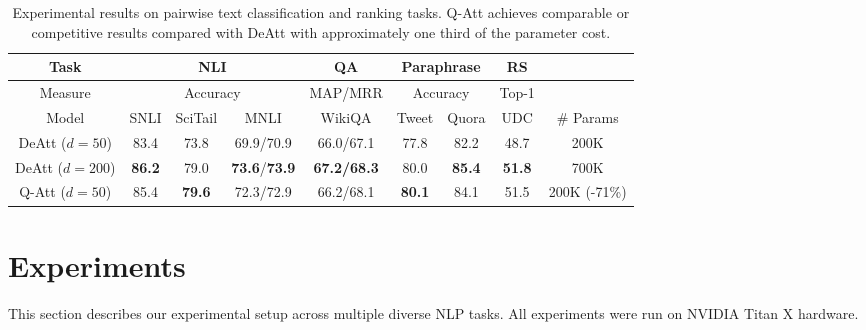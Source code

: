 \documentclass[11pt,a4paper]{article}
\begin{document}
\begin{table}
  \centering
  \small
    \begin{tabular}{c|ccc|c|cc|c|c}
    \hline
     Task & \multicolumn{3}{c|}{NLI} & QA & \multicolumn{2}{c|}{Paraphrase} & \multicolumn{1}{c|}{RS} & \\
    \hline
     Measure & \multicolumn{3}{c|}{Accuracy} & MAP/MRR & \multicolumn{2}{c|}{Accuracy} & \multicolumn{1}{c|}{Top-1} & \\
    \hline
          Model & \multicolumn{1}{c}{SNLI} & \multicolumn{1}{c}{SciTail} & MNLI  & WikiQA  & \multicolumn{1}{c}{Tweet} & \multicolumn{1}{c|}{Quora} & \multicolumn{1}{c|}{UDC} & \# Params \\
          \hline

    DeAtt ($d=50$) &  83.4     & 73.8      &  69.9/70.9 &  66.0/67.1 &    77.8   & 82.2  &  48.7     & 200K \\
    DeAtt ($d=200$) & \textbf{86.2}      & 79.0      & \textbf{73.6}/\textbf{73.9} & \textbf{67.2/68.3} &   80.0    & \textbf{85.4} &  \textbf{51.8}     & 700K \\
    \hline
    Q-Att ($d=50$) &  85.4     & \textbf{79.6} & 72.3/72.9 & 66.2/68.1 & \textbf{80.1}     & 84.1 &      51.5 & 200K (-71\%) \\
      \hline
    \end{tabular}%
   \caption{Experimental results on pairwise text classification and ranking tasks. Q-Att achieves comparable or competitive results compared with DeAtt with approximately one third of the parameter cost.}
     \label{tab:ptc}%
\end{table}%

\section{Experiments}
This section describes our experimental setup across multiple diverse NLP tasks. All experiments were run on NVIDIA Titan X hardware.
\end{document}
